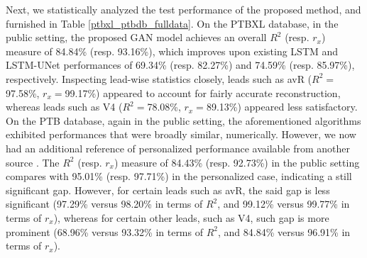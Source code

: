 \documentclass[conference]{IEEEtran}
\begin{document}
Next, we statistically analyzed the test performance of the proposed method, and furnished in Table \ref{ptbxl_ptbdb_fulldata}. On the PTBXL database, in the public setting, the proposed GAN model achieves an overall $R^2$ (resp. $r_x$) measure of 84.84\% (resp. 93.16\%), which improves upon existing LSTM and LSTM-UNet performances of 69.34\% (resp. 82.27\%) and 74.59\% (resp. 85.97\%), respectively. Inspecting lead-wise statistics closely, leads such as avR ($R^2=$97.58\%, $r_x=$99.17\%) appeared to account for fairly accurate reconstruction, whereas leads such as V4 ($R^2=$78.08\%, $r_x=$89.13\%) appeared less satisfactory. 
On the PTB database, again in the public setting, the aforementioned algorithms exhibited performances that were broadly similar, numerically. However, we now had an additional reference of personalized performance available from another source \cite{lstm-unet}. The $R^2$ (resp. $r_x$) measure of 84.43\% (resp. 92.73\%) in the public setting compares with 95.01\% (resp. 97.71\%) in the personalized case, indicating a still significant gap. However, for certain leads such as avR, the said gap is less significant (97.29\% versus 98.20\% in terms of $R^2$, and 99.12\% versus 99.77\% in terms of $r_x$), whereas for certain other leads, such as V4, such gap is more prominent (68.96\% versus 93.32\% in terms of $R^2$, and 84.84\% versus 96.91\% in terms of $r_x$).


\end{document}
